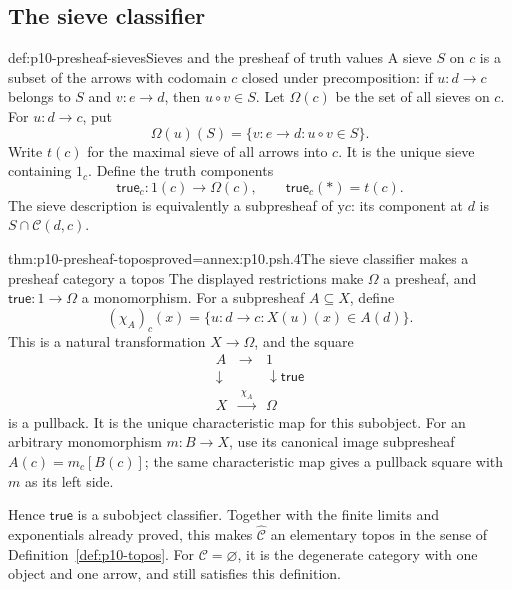 \subsection{The sieve classifier}
\label{sec:p10-presheaf-classifier}

\begin{hbdefinition}{def:p10-presheaf-sieves}{Sieves and the presheaf of truth values}
A sieve \(S\) on \(c\) is a subset of the arrows with codomain \(c\)
closed under precomposition: if \(u:d\to c\) belongs to \(S\)
and \(v:e\to d\), then \(u\circ v\in S\).
Let \(\Omega(c)\) be the set of all sieves on \(c\).
For \(u:d\to c\), put
\[
             \Omega(u)(S)=
                \{v:e\to d:u\circ v\in S\}.
\]
Write \(t(c)\) for the maximal sieve of all arrows into \(c\).
It is the unique sieve containing \(1_c\).
Define the truth components
\[
                    \mathsf{true}_c:1(c)\to\Omega(c),
                    \qquad \mathsf{true}_c(*)=t(c).
\]
The sieve description is equivalently a subpresheaf of
\(\mathrm y c\): its component at \(d\) is
\(S\cap\mathcal C(d,c)\).
\end{hbdefinition}

\begin{hbtheorem}{thm:p10-presheaf-topos}{proved=annex:p10.psh.4}{The sieve classifier makes a presheaf category a topos}
The displayed restrictions make \(\Omega\) a presheaf, and
\(\mathsf{true}:1\to\Omega\) a monomorphism.
For a subpresheaf \(A\subseteq X\), define
\[
       (\chi_A)_c(x)=
              \{u:d\to c:X(u)(x)\in A(d)\}.
\]
This is a natural transformation \(X\to\Omega\), and the square
\[
\begin{array}{ccc}
 A&\longrightarrow&1\\
 \downarrow&&\downarrow{\scriptstyle\mathsf{true}}\\
 X&\xrightarrow{\ \chi_A\ }&\Omega
\end{array}
\]
is a pullback.  It is the unique characteristic map for this
subobject.
For an arbitrary monomorphism \(m:B\to X\), use its canonical
image subpresheaf \(A(c)=m_c[B(c)]\); the same characteristic
map gives a pullback square with \(m\) as its left side.

Hence \(\mathsf{true}\) is a subobject classifier.
Together with the finite limits and exponentials already proved,
this makes \(\widehat{\mathcal C}\) an elementary topos in the
sense of Definition~\ref{def:p10-topos}.
For \(\mathcal C=\varnothing\), it is the degenerate category
with one object and one arrow, and still satisfies this definition.
\end{hbtheorem}

